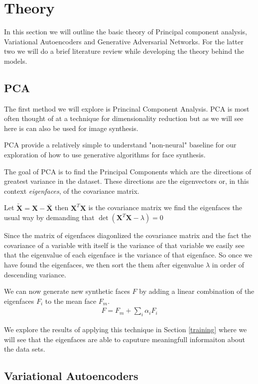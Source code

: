 \newpage
\section{Theory} \label{theory}
In this section we will outline the basic theory of Principal component analysis, Variational Autoencoders and Generative Adversarial Networks. For the latter two we will do a brief literature review while developing the theory behind the models.

\subsection{PCA}
The first method we will explore is Princinal Component Analysis. PCA is most often thought of at a technique for dimensionality reduction but as we will see here is can also be used for image synthesis.

PCA provide a relatively simple to understand "non-neural" baseline for our exploration of how to use  generative algorithms for face synthesis.

The goal of PCA is to find the Principal Components which are the directions of greatest variance in the dataset. These directions are the eigenvectors or, in this context \emph{eigenfaces}, of the covariance matrix.

Let $\tilde{\mathbf{X}} = \mathbf{X} - \bar{\mathbf{X}}$ then $\mathbf{X}^T\mathbf{X}$ is the covariance matrix we find the eigenfaces the usual way by demanding that $\det(\mathbf{X}^T\mathbf{X} - \lambda) = 0$

Since the matrix of eigenfaces diagonlized the covariance matrix and the fact the covariance of a variable with itself is the variance of that variable we easily see that the eigenvalue of each eigenface is the variance of that eigenface. So once we have found the eigenfaces, we then sort the them after eigenvalue $\lambda$ in order of descending variance.

We can now generate new synthetic faces $F$ by adding a linear combination of the eigenfaces $F_i$ to the mean face $F_m$.
\begin{align}
F  = F_m + \sum_{i} \alpha_i F_i
\end{align}

We explore the results of applying this technique in Section \ref{training} where we will see that the eigenfaces are able to caputure meaningfull informaiton about the data sets.

\subsection{Variational Autoencoders}


